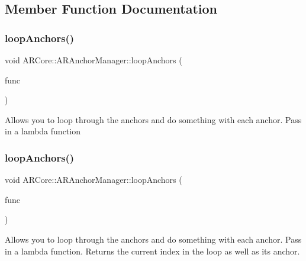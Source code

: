 \subsection{Member Function Documentation}
\mbox{\label{class_a_r_core_1_1_a_r_anchor_manager_a687246a5f0aacaac63053c0e05081e11}} 
\subsubsection{\texorpdfstring{loop\+Anchors()}{loopAnchors()}\hspace{0.1cm}{\footnotesize\ttfamily [1/2]}}
{\footnotesize\ttfamily void A\+R\+Core\+::\+A\+R\+Anchor\+Manager\+::loop\+Anchors (\begin{DoxyParamCaption}\item[{std\+::function$<$ void(\hyperlink{struct_a_r_objects_1_1_a_r_object}{A\+R\+Object})$>$}]{func }\end{DoxyParamCaption})}

Allows you to loop through the anchors and do something with each anchor. Pass in a lambda function \mbox{\label{class_a_r_core_1_1_a_r_anchor_manager_a03ee4092b5d958f8b1467e0a0e62f9b9}} 
\subsubsection{\texorpdfstring{loop\+Anchors()}{loopAnchors()}\hspace{0.1cm}{\footnotesize\ttfamily [2/2]}}
{\footnotesize\ttfamily void A\+R\+Core\+::\+A\+R\+Anchor\+Manager\+::loop\+Anchors (\begin{DoxyParamCaption}\item[{std\+::function$<$ void(\hyperlink{struct_a_r_objects_1_1_a_r_object}{A\+R\+Object}, int index)$>$}]{func }\end{DoxyParamCaption})}

Allows you to loop through the anchors and do something with each anchor. Pass in a lambda function. Returns the current index in the loop as well as it\textquotesingle{}s anchor. \mbox{\label{class_a_r_core_1_1_a_r_anchor_manager_aeaa578780e37129fb899b3f5a762af63}} 

